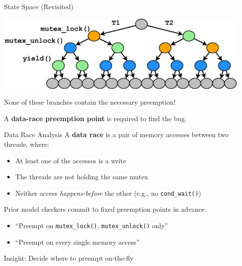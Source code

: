 \documentclass[xcolor=dvipsnames]{beamer}
\begin{document}
\begin{frame}{State Space (Revisited)}
	\begin{center}
		\includegraphics[width=0.96\textwidth]{../../oopsla/tree-maximal-only.pdf}
	\end{center}
	\linegap

	None of these branches contain the necessary preemption!
	\linegap

	A {\bf data-race preemption point} is required to find the bug.
\end{frame}

\begin{frame}{Data Race Analysis}
	A {\bf data race} is a pair of memory accesses between two threads, where:
	\begin{itemize}
		\item At least one of the accesses is a write
		\item The threads are not holding the same mutex
		\item Neither access {\em happens-before} the other
			(e.g., no \texttt{cond\_wait()})
	\end{itemize}
	\pause
	\linegap

	Prior model checkers commit to fixed preemption points in advance.
	\begin{itemize}
		\item ``Preempt on {\tt mutex\_lock()}, {\tt mutex\_unlock()} only''
		\item ``Preempt on every single memory access''
	\end{itemize}
	\linegap

	Insight: Decide where to preempt on-the-fly

\end{frame}
\end{document}
